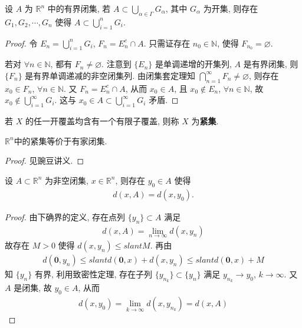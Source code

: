 \documentclass[../../main.tex]{subfiles}
\begin{document}
\begin{theorem}[有限覆盖定理]\label{theorem:有限覆盖定理}
设 $A$ 为 $\mathbb{R}^n$ 中的有界闭集, 若 $A \subset \bigcup_{\alpha \in \varGamma} G_\alpha$, 其中 $G_\alpha$ 为开集, 则存在 $G_1, G_2, \cdots, G_n$ 使得 $A \subset \bigcup_{i = 1}^{n} G_i$.
\end{theorem}
\begin{proof}
令 $E_n = \bigcup_{i = 1}^{n} G_i$, $F_n = E_n^c \cap A$. 只需证存在 $n_0 \in \mathbb{N}$, 使得 $F_{n_0} = \varnothing$.

若对 $\forall n \in \mathbb{N}$, 都有 $F_n \neq \varnothing$. 注意到 $\{E_n\}$ 是单调递增的开集列, $A$ 是有界闭集, 则 $\{F_n\}$ 是有界单调递减的非空闭集列. 由闭集套定理知 $\bigcap_{n = 1}^{\infty} F_n \neq \varnothing$, 则存在 $x_0 \in F_n$, $\forall n \in \mathbb{N}$. 又 $F_n = E_n^c \cap A$, 从而 $x_0 \in A$, 且 $x_0 \notin E_n$, $\forall n \in \mathbb{N}$, 故 $x_0 \notin \bigcup_{i = 1}^{\infty} G_i$. 这与 $x_0 \in A \subset \bigcup_{i = 1}^{\infty} G_i$ 矛盾.
\end{proof}

\begin{definition}[紧集]
若 $X$ 的任一开覆盖均含有一个有限子覆盖, 则称 $X$ 为\textbf{紧集}.
\end{definition}

\begin{theorem}\label{theorem:mathbb{R}^n中的紧集等价于有家闭集.}
$\mathbb{R}^n$中的紧集等价于有家闭集.
\end{theorem}
\begin{proof}
见豌豆讲义.
\end{proof}

\begin{theorem}
设 $A \subset \mathbb{R}^n$ 为非空闭集, $x \in \mathbb{R}^n$, 则存在 $y_0 \in A$ 使得
\begin{align*}
d(x, A) = d(x, y_0).
\end{align*}
\end{theorem}
\begin{proof}
由下确界的定义, 存在点列 $\{y_n\} \subset A$ 满足
\begin{align*}
d(x, A) = \lim_{n \to \infty} d(x, y_n)
\end{align*}
故存在 $M > 0$ 使得 $d(x, y_n) \leqslant slant M$. 再由
\begin{align*}
d(\mathbf{0}, y_n) \leqslant slant d(\mathbf{0}, x) + d(x, y_n) \leqslant slant d(\mathbf{0}, x) + M
\end{align*}
知 $\{y_n\}$ 有界, 利用致密性定理, 存在子列 $\{y_{n_k}\} \subset \{y_n\}$ 满足 $y_{n_k} \to y_0$, $k \to \infty$. 又 $A$ 是闭集, 故 $y_0 \in A$, 从而
\begin{align*}
d(x, y_0) = \lim_{k \to \infty} d(x, y_{n_k}) = d(x, A)
\end{align*}
\end{proof}
\end{document}
